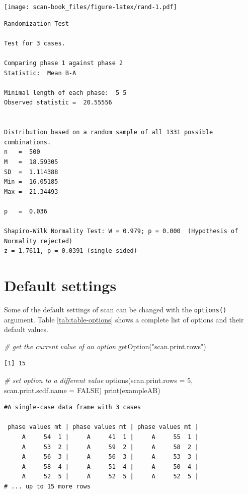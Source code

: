 \documentclass[
]{book}
\newenvironment{Shaded}{\begin{snugshade}}{\end{snugshade}}
\newcommand{\AttributeTok}[1]{\textcolor[rgb]{0.77,0.63,0.00}{#1}}
\newcommand{\CommentTok}[1]{\textcolor[rgb]{0.56,0.35,0.01}{\textit{#1}}}
\newcommand{\ConstantTok}[1]{\textcolor[rgb]{0.00,0.00,0.00}{#1}}
\newcommand{\DecValTok}[1]{\textcolor[rgb]{0.00,0.00,0.81}{#1}}
\newcommand{\FunctionTok}[1]{\textcolor[rgb]{0.00,0.00,0.00}{#1}}
\newcommand{\NormalTok}[1]{#1}
\newcommand{\StringTok}[1]{\textcolor[rgb]{0.31,0.60,0.02}{#1}}
\begin{document}
\texttt{[image: scan-book\_files/figure-latex/rand-1.pdf]}

\begin{verbatim}
Randomization Test

Test for 3 cases.

Comparing phase 1 against phase 2 
Statistic:  Mean B-A 

Minimal length of each phase:  5 5 
Observed statistic =  20.55556 


Distribution based on a random sample of all 1331 possible combinations.
n   =  500 
M   =  18.59305 
SD  =  1.114388 
Min =  16.05185 
Max =  21.34493 

p   =  0.036 

Shapiro-Wilk Normality Test: W = 0.979; p = 0.000  (Hypothesis of Normality rejected)
z = 1.7611, p = 0.0391 (single sided)
\end{verbatim}

\hypertarget{default-settings}{%
\chapter{Default settings}\label{default-settings}}

Some of the default settings of scan can be changed with the \texttt{options()} argument. Table \ref{tab:table-options} shows a complete list of options and their default values.

\begin{Shaded}
\begin{Highlighting}[]
\CommentTok{\# get the current value of an option}
\FunctionTok{getOption}\NormalTok{(}\StringTok{"scan.print.rows"}\NormalTok{)}
\end{Highlighting}
\end{Shaded}

\begin{verbatim}
[1] 15
\end{verbatim}

\begin{Shaded}
\begin{Highlighting}[]
\CommentTok{\# set option to a different value}
\FunctionTok{options}\NormalTok{(}\AttributeTok{scan.print.rows =} \DecValTok{5}\NormalTok{, }\AttributeTok{scan.print.scdf.name =} \ConstantTok{FALSE}\NormalTok{)}
\FunctionTok{print}\NormalTok{(exampleAB)}
\end{Highlighting}
\end{Shaded}

\begin{verbatim}
#A single-case data frame with 3 cases

 phase values mt | phase values mt | phase values mt |
     A     54  1 |     A     41  1 |     A     55  1 |
     A     53  2 |     A     59  2 |     A     58  2 |
     A     56  3 |     A     56  3 |     A     53  3 |
     A     58  4 |     A     51  4 |     A     50  4 |
     A     52  5 |     A     52  5 |     A     52  5 |
# ... up to 15 more rows
\end{verbatim}
\end{document}
